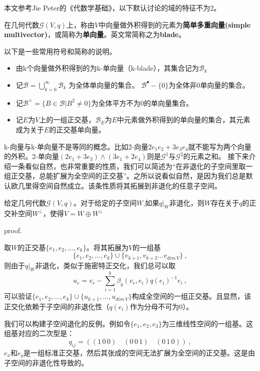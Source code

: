

\begin{issues}
\issueTODO
\end{issues}

本文参考Jie Peter的《代数学基础》，以下默认讨论的域的特征不为2。

\begin{definition}{}
在几何代数$\mathcal G(V,q)$上，称由$V$中向量做外积得到的元素为\textbf{简单多重向量(simple multivector)}，或简称为\textbf{单向量}。英文常简称之为\textbf{blade}。

以下是一些常用符号和简称的说明。
\begin{itemize}
\item 由k个向量做外积得到的为k-单向量（k-blade），其集合记为$\mathcal B_k$
\item 记$\mathcal B=\bigcup \limits ^{\infty}_{k=0}\mathcal B_k$
为全体单向量的集合。
$\mathcal B^{\bullet}-\{0\}$为全体非0单向量的集合。
\item 记$\mathcal B^{\times}=\{B\in\mathcal B|B^2\neq0\}$为全体平方不为0的单向量集合。
\item 记$E$为$V$上的一组正交基，$\mathcal B_E$为$E$中元素做外积得到的单向量的集合，其元素成为关于$E$的正交基单向量。
\end{itemize}
\end{definition}
k-向量与k-单向量不是等同的概念。比如2-向量$2e_1e_2+3e_3e_4$就不能写为两个向量的外积。2-单向量$(2e_1+3e_3)\wedge(3e_1+2e_4)$则是$\mathcal G^1$与$\mathcal G^2$的元素之和。
接下来介绍一条看似自然，也非常重要的性质，我们可以简述为“在非退化的子空间里取一组正交基，总能扩展为全空间的正交基”。之所以说看似自然，是因为我们总是默认欧几里得空间自然成立。该条性质将其拓展到非退化的任意子空间。
\begin{theorem}{}
给定几何代数$\mathcal G(V,q)$。对于给定的子空间$W$,如果$q|_W$非退化，则$W$存在关于$q$的正交补空间$W^{\bot}$，使得$V=W\oplus W^{\bot}$
\end{theorem}

proof.

取$W$的正交基$\{e_1,e_2,...,e_k\}$。将其拓展为$V$的一组基
\begin{equation}
\{e_1,e_2,...,e_k\}\cup\{v_{k+1},v_{k+2}...v_{dim \,V}\}~,
\end{equation}
则由于$q|_W$非退化，类似于施密特正交化，我们总可以取
\begin{equation}
u_r=v_r-\sum ^{k}_{i=1}\beta_q(v_r,e_i)q(e_i)^{-1}e_i~,
\end{equation}
可以验证$\{e_1,e_2,...,e_k\}\cup\{u_{k+1},...,u_{dim\,V}\}$构成全空间的一组正交基。且显然，该正交化依赖于子空间的非退化性（$q(e_i)$作为分母不可为$0$）。

我们可以构建子空间退化的反例。例如令$\{e_1,e_2,e_3\}$为三维线性空间的一组基。这组基对应的二次型是：
\begin{equation}
q_{ij}=((1\,0\,0)\quad (0\,0\,1)\quad(0\,1\,0))~,
\end{equation}
$e_x$和$e_y$是一组标准正交基，然后其张成的空间无法扩展为全空间的正交基。这是由子空间的非退化性导致的。